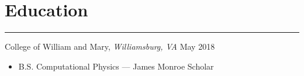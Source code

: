 \documentclass[12pt]{article}
\begin{document}

\vspace{-0.50cm}
\section*{Education}
\vspace{-0.1cm}
\hrule
\vspace{0.25cm}

\noindent College of William and Mary, \textit{Williamsburg, VA} \hfill May 2018
\vspace{-0.1cm}
\begin{itemize}
  \itemsep-0.4em
        \item B.S. Computational Physics --- James Monroe Scholar
\end{itemize}
\end{document}
